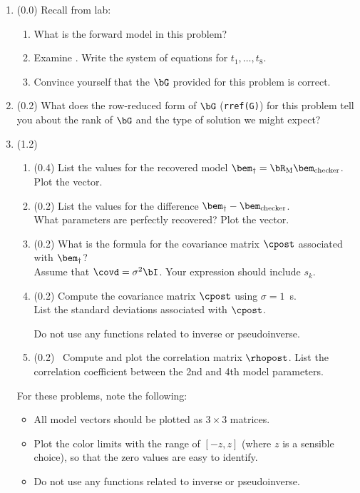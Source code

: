 \documentclass[11pt,titlepage,fleqn]{article}
\begin{document}
\begin{enumerate}

\item (0.0) Recall from lab:
%
\begin{enumerate}
\item What is the forward model in this problem?
\item Examine . Write the system of equations for $t_1, \ldots, t_8$.
\item Convince yourself that the $\bG$ provided for this problem is correct.
\end{enumerate}

\item (0.2) What does the row-reduced form of $\bG$ (\verb+rref(G)+) for this problem tell you about the rank of $\bG$ and the type of solution we might expect?

\pagebreak
\item (1.2) 
\begin{enumerate}
\item (0.4) List the values for the recovered model $\bem_{\dagger} = \bR_{\rm M}\bem_{\rm checker}$. Plot the vector.

\item (0.2) List the values for the difference $\bem_{\dagger}-\bem_{\rm checker}$. \\
What parameters are perfectly recovered? Plot the vector.

\item (0.2) What is the formula for the covariance matrix $\cpost$ associated with $\bem_{\dagger}$? \\ Assume that $\covd = \sigma^2\bI$. Your expression should include $s_k$.

\item (0.2) Compute the covariance matrix $\cpost$ using $\sigma = 1$~s. \\
List the standard deviations associated with $\cpost$.

Do not use any functions related to inverse or pseudoinverse.

\item (0.2) \ptag\ Compute and plot the correlation matrix $\rhopost$. List the correlation coefficient between the 2nd and 4th model parameters.
\end{enumerate}

For these problems, note the following:
%
\begin{itemize}
\item All model vectors should be plotted as $3 \times 3$ matrices.
\item Plot the color limits with the range of $[-z,z]$ (where $z$ is a sensible choice), so that the zero values are easy to identify.
\item Do not use any functions related to inverse or pseudoinverse.
\end{itemize}


\end{enumerate}
\end{document}
